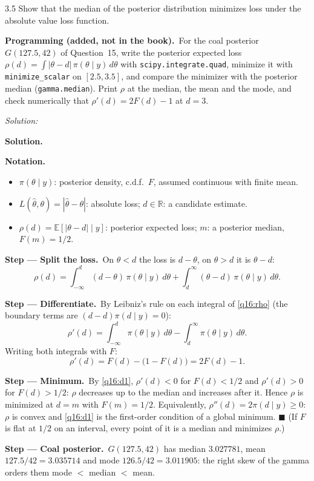 \documentclass[11pt,a4paper]{article}
\newif\ifsolucoes
\newcommand{\espacoresol}{4.5cm}   %
\numberwithin{equation}{questao}   %
\newcommand{\programacao}{\par\smallskip\noindent\textbf{Programming (added, not in the book).}~}
\newenvironment{notacao}{\par\smallskip\noindent\textbf{Notation.}\begin{itemize}[leftmargin=1.4em,topsep=1pt,itemsep=0pt]\small}{\end{itemize}}
\newcommand{\resolespaco}{\ifsolucoes\else\par\textit{Solution:}\vspace{\espacoresol}\par\fi}
\newcommand{\passo}[2]{\par\smallskip\noindent\textbf{Step --- #1.}~#2}
\newcommand{\solhead}{\par\medskip\noindent{\color{blue!55!black}\rule{\linewidth}{0.3pt}}\par\noindent\textbf{Solution.}}
\newcommand{\E}{\mathbb{E}}
\newcommand{\1}{\mathbf{1}}
\begin{document}
3.5 Show that the median of the posterior distribution minimizes loss under the absolute value loss
function.
\programacao For the coal posterior $G(127.5,42)$ of Question~15, write the posterior expected
loss $\rho(d)=\int|\theta-d|\,\pi(\theta\mid y)\,d\theta$ with \texttt{scipy.integrate.quad}, minimize it
with \texttt{minimize\_scalar} on $[2.5,3.5]$, and compare the minimizer with the posterior median
(\texttt{gamma.median}). Print $\rho$ at the median, the mean and the mode, and check numerically
that $\rho'(d)=2F(d)-1$ at $d=3$.
\resolespaco
\begin{sol}
\solhead
\begin{notacao}
\item $\pi(\theta\mid y)$: posterior density, c.d.f.\ $F$, assumed continuous with finite mean.
\item $L(\hat\theta,\theta)=|\hat\theta-\theta|$: absolute loss; $d\in\mathbb R$: a candidate estimate.
\item $\rho(d)=\E[|\theta-d|\mid y]$: posterior expected loss; $m$: a posterior median, $F(m)=1/2$.
\end{notacao}

\passo{Split the loss}{On $\theta<d$ the loss is $d-\theta$, on $\theta>d$ it is $\theta-d$:}
\begin{equation}\label{q16:rho}
\rho(d)=\int_{-\infty}^{d}(d-\theta)\,\pi(\theta\mid y)\,d\theta+\int_{d}^{\infty}(\theta-d)\,\pi(\theta\mid y)\,d\theta .
\end{equation}

\passo{Differentiate}{By Leibniz's rule on each integral of \eqref{q16:rho} (the boundary terms are
$(d-d)\pi(d\mid y)=0$):}
\[
\rho'(d)=\int_{-\infty}^{d}\pi(\theta\mid y)\,d\theta-\int_{d}^{\infty}\pi(\theta\mid y)\,d\theta .
\]
Writing both integrals with $F$:
\begin{equation}\label{q16:d1}
\rho'(d)=F(d)-\big(1-F(d)\big)=2F(d)-1 .
\end{equation}

\passo{Minimum}{By \eqref{q16:d1}, $\rho'(d)<0$ for $F(d)<1/2$ and $\rho'(d)>0$ for $F(d)>1/2$:
$\rho$ decreases up to the median and increases after it. Hence $\rho$ is minimized at $d=m$ with
$F(m)=1/2$. Equivalently, $\rho''(d)=2\pi(d\mid y)\ge0$: $\rho$ is convex and \eqref{q16:d1} is
the first-order condition of a global minimum. $\blacksquare$ (If $F$ is flat at $1/2$ on an interval,
every point of it is a median and minimizes $\rho$.)}

\passo{Coal posterior}{$G(127.5,42)$ has median $3.027781$, mean $127.5/42=3.035714$ and mode
$126.5/42=3.011905$: the right skew of the gamma orders them mode $<$ median $<$ mean.}


\end{sol}
\end{document}
